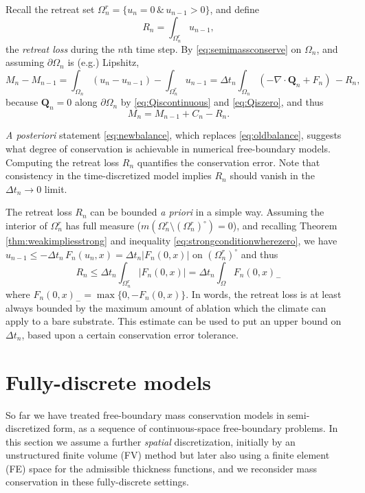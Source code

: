 \documentclass[final,onefignum]{siamart190516}
\newcommand\bQ{\mathbf{Q}}
\newcommand{\Div}{\nabla\cdot}
\begin{document}
Recall the retreat set $\Omega_n^r=\{u_n = 0 \,\&\,u_{n-1}>0\}$, and define
\begin{equation}
R_n = \int_{\Omega_n^r} u_{n-1}, \label{eq:retreatlossseries}
\end{equation}
the \emph{retreat loss} during the $n$th time step.  By \eqref{eq:semimassconserve} on $\Omega_n$, and assuming $\partial \Omega_n$ is (e.g.) Lipshitz,
    $$M_n - M_{n-1} = \int_{\Omega_n} (u_n - u_{n-1}) - \int_{\Omega_n^r} u_{n-1} = \Delta t_n \int_{\Omega_n} (- \Div \bQ_n + F_n) \, - R_n,$$
because $\bQ_n=0$ along $\partial \Omega_n$ by \eqref{eq:Qiscontinuous} and \eqref{eq:Qiszero}, and thus
\begin{equation}
M_n = M_{n-1} + C_n - R_n. \label{eq:newbalance}
\end{equation}

\emph{A posteriori} statement \eqref{eq:newbalance}, which replaces \eqref{eq:oldbalance}, suggests what degree of conservation is achievable in numerical free-boundary models.  Computing the retreat loss $R_n$ quantifies the conservation error.  Note that consistency in the time-discretized model implies $R_n$ should vanish in the $\Delta t_n\to 0$ limit.

The retreat loss $R_n$ can be bounded \emph{a priori} in a simple way.  Assuming the interior of $\Omega_n^r$ has full measure ($m(\Omega_n^r \setminus (\Omega_n^r)^\circ)=0$), and recalling Theorem \ref{thm:weakimpliesstrong} and inequality \eqref{eq:strongconditionwherezero}, we have $u_{n-1} \le -\Delta t_n\,F_n(u_n,x) = \Delta t_n |F_n(0,x)|$ on $(\Omega_n^r)^\circ$ and thus
\begin{equation}
R_n \le \Delta t_n \int_{\Omega_n^r} |F_n(0,x)| = \Delta t_n \int_\Omega F_n(0,x)_- \label{eq:retreatbound}
\end{equation}
where $F_n(0,x)_- = \max\{0,-F_n(0,x)\}$.  In words, the retreat loss is at least always bounded by the maximum amount of ablation which the climate can apply to a bare substrate.  This estimate can be used to put an upper bound on $\Delta t_n$, based upon a certain conservation error tolerance.


\section{Fully-discrete models}  \label{sec:spacediscretized}

So far we have treated free-boundary mass conservation models in semi-discretized form, as a sequence of continuous-space free-boundary problems.  In this section we assume a further \emph{spatial} discretization, initially by an unstructured finite volume (FV) method \cite{LeVeque2002} but later also using a finite element (FE) space for the admissible thickness functions, and we reconsider mass conservation in these fully-discrete settings.
\end{document}
